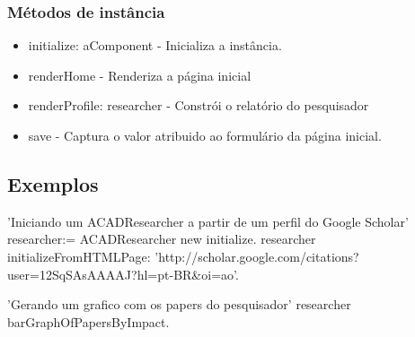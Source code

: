 \subsubsection{Métodos de instância}

\begin{itemize}
  \item initialize: aComponent - Inicializa a instância.

  \item renderHome - Renderiza a página inicial

  \item renderProfile: researcher - Constrói o relatório do pesquisador

  \item save - Captura o valor atribuido ao formulário da página inicial.

\end{itemize}


\subsection{Exemplos}
\begin{godCode}
'Iniciando um ACADResearcher a partir de um perfil do Google Scholar'
researcher:= ACADResearcher new initialize.
researcher initializeFromHTMLPage: 'http://scholar.google.com/citations?user=12SqSAsAAAAJ?hl=pt-BR&oi=ao'.

'Gerando um grafico com os papers do pesquisador'
researcher barGraphOfPapersByImpact.
\end{godCode}
